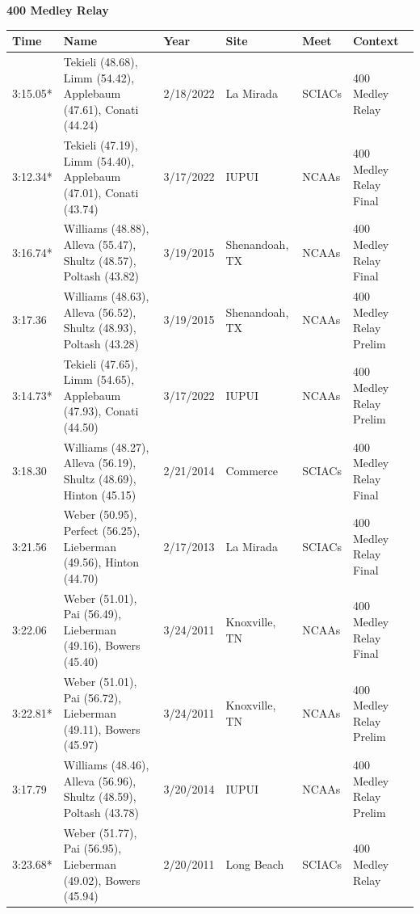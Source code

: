 \begin{table}[H]
\centering
\begin{minipage}[t]{0.6\textwidth}
\centering
\textbf{400 Medley Relay}\\[0.1cm]
\begin{tabular}{@{}p{1.8cm}p{2.8cm}p{1.2cm}p{1.4cm}p{1.4cm}p{2.0cm}@{}}
\hline
    \textbf{Time} & \textbf{Name} & \textbf{Year} & \textbf{Site} & \textbf{Meet} & \textbf{Context} \\
\hline
    3:15.05* & Tekieli (48.68), Limm (54.42), Applebaum (47.61), Conati (44.24) & 2/18/2022 & La Mirada & SCIACs & 400 Medley Relay \\
    3:12.34* & Tekieli (47.19), Limm (54.40), Applebaum (47.01), Conati (43.74) & 3/17/2022 & IUPUI & NCAAs & 400 Medley Relay Final \\
    3:16.74* & Williams (48.88), Alleva (55.47), Shultz (48.57), Poltash (43.82) & 3/19/2015 & Shenandoah, TX & NCAAs & 400 Medley Relay Final \\
    3:17.36 & Williams (48.63), Alleva (56.52), Shultz (48.93), Poltash (43.28) & 3/19/2015 & Shenandoah, TX & NCAAs & 400 Medley Relay Prelim \\
    3:14.73* & Tekieli (47.65), Limm (54.65), Applebaum (47.93), Conati (44.50) & 3/17/2022 & IUPUI & NCAAs & 400 Medley Relay Prelim \\
    3:18.30 & Williams (48.27), Alleva (56.19), Shultz (48.69), Hinton (45.15) & 2/21/2014 & Commerce & SCIACs & 400 Medley Relay Final \\
    3:21.56 & Weber (50.95), Perfect (56.25), Lieberman (49.56), Hinton (44.70) & 2/17/2013 & La Mirada & SCIACs & 400 Medley Relay Final \\
    3:22.06 & Weber (51.01), Pai (56.49), Lieberman (49.16), Bowers (45.40) & 3/24/2011 & Knoxville, TN & NCAAs & 400 Medley Relay Final \\
    3:22.81* & Weber (51.01), Pai (56.72), Lieberman (49.11), Bowers (45.97) & 3/24/2011 & Knoxville, TN & NCAAs & 400 Medley Relay Prelim \\
    3:17.79 & Williams (48.46), Alleva (56.96), Shultz (48.59), Poltash (43.78) & 3/20/2014 & IUPUI & NCAAs & 400 Medley Relay Prelim \\
    3:23.68* & Weber (51.77), Pai (56.95), Lieberman (49.02), Bowers (45.94) & 2/20/2011 & Long Beach & SCIACs & 400 Medley Relay \\
\hline
\end{tabular}
\end{minipage}
\end{table}


\newpage


